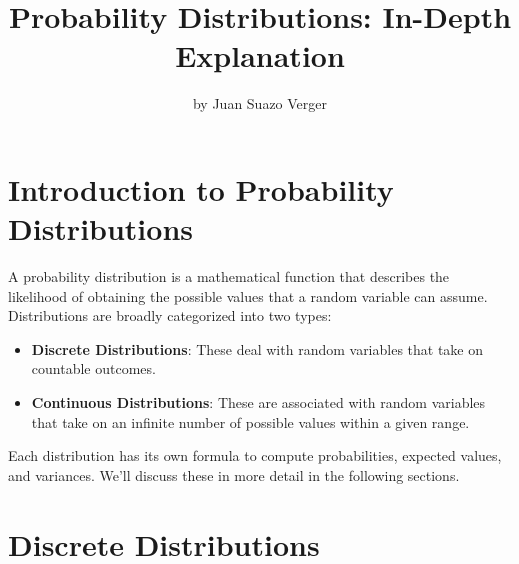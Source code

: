 \documentclass{article}
\title{Probability Distributions: In-Depth Explanation}
\author{by Juan Suazo Verger}
\date{}
\begin{document}
\maketitle

\pagestyle{fancy}
\fancyhf{}
\fancyhead[L]{\leftmark}
\fancyhead[R]{\thepage}

\newpage
\section{Introduction to Probability Distributions}
A probability distribution is a mathematical function that describes the likelihood of obtaining the possible values that a random variable can assume. Distributions are broadly categorized into two types:
\begin{itemize}
    \item \textbf{Discrete Distributions}: These deal with random variables that take on countable outcomes.
    \item \textbf{Continuous Distributions}: These are associated with random variables that take on an infinite number of possible values within a given range.
\end{itemize}

Each distribution has its own formula to compute probabilities, expected values, and variances. We'll discuss these in more detail in the following sections.

\newpage
\section{Discrete Distributions}
\end{document}
